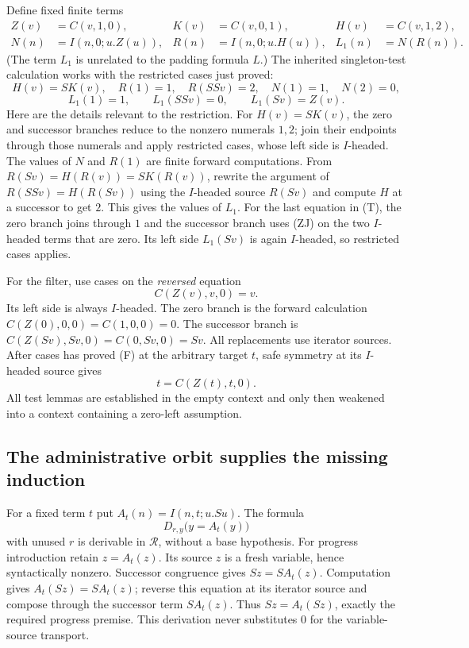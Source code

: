 \documentclass[11pt,letterpaper]{article}
\theoremstyle{definition}\newtheorem{definition}[theorem]{Definition}
\theoremstyle{remark}\newtheorem{remark}[theorem]{Remark}
\begin{document}
Define fixed finite terms
\[
\begin{aligned}
 Z(v)&=C(v,1,0),& K(v)&=C(v,0,1),& H(v)&=C(v,1,2),\\
 N(n)&=I(n,0;u.Z(u)),& R(n)&=I(n,0;u.H(u)),& L_1(n)&=N(R(n)).
\end{aligned}
\]
(The term $L_1$ is unrelated to the padding formula $L$.) The inherited
singleton-test calculation works with the restricted cases just proved:
\[
 H(v)=S K(v),\quad R(1)=1,\quad R(SSv)=2,\quad
 N(1)=1,\quad N(2)=0,
\]
\[
             L_1(1)=1,\qquad L_1(SSv)=0,\qquad
             L_1(Sv)=Z(v).                                \tag{T}
\]
Here are the details relevant to the restriction. For $H(v)=SK(v)$,
the zero and successor branches reduce to the nonzero numerals $1,2$;
join their endpoints through those numerals and apply restricted cases,
whose left side is $I$-headed. The values of $N$ and $R(1)$ are finite
forward computations. From
$R(Sv)=H(R(v))=SK(R(v))$, rewrite the argument of
$R(SSv)=H(R(Sv))$ using the $I$-headed source $R(Sv)$ and compute $H$ at
a successor to get $2$. This gives the values of $L_1$. For the last
equation in (T), the zero branch joins through $1$ and the successor
branch uses (ZJ) on the two $I$-headed terms that are zero. Its left side
$L_1(Sv)$ is again $I$-headed, so restricted cases applies.

For the filter, use cases on the \emph{reversed} equation
\[
                     C(Z(v),v,0)=v.                        \tag{F}
\]
Its left side is always $I$-headed. The zero branch is the forward
calculation $C(Z(0),0,0)=C(1,0,0)=0$. The successor branch is
$C(Z(Sv),Sv,0)=C(0,Sv,0)=Sv$. All replacements use iterator
sources. After cases has proved (F) at the arbitrary target $t$, safe
symmetry at its $I$-headed source gives
\[
                        t=C(Z(t),t,0).                    \tag{F'}
\]
All test lemmas are established in the empty context and only then
weakened into a context containing a zero-left assumption.

\subsection{The administrative orbit supplies the missing induction}

For a fixed term $t$ put $A_t(n)=I(n,t;u.Su)$. The formula
\[
                D_{r,y}\bigl(y=A_t(y)\bigr)               \tag{OC}
\]
with unused $r$ is derivable in $\mathcal R$, without a base hypothesis.
For progress introduction retain $z=A_t(z)$. Its source $z$ is a fresh
variable, hence syntactically nonzero. Successor congruence gives
$Sz=SA_t(z)$. Computation gives $A_t(Sz)=SA_t(z)$; reverse this equation
at its iterator source and compose through the successor term
$SA_t(z)$. Thus $Sz=A_t(Sz)$, exactly the required progress premise.
This derivation never substitutes $0$ for the variable-source transport.
\end{document}
